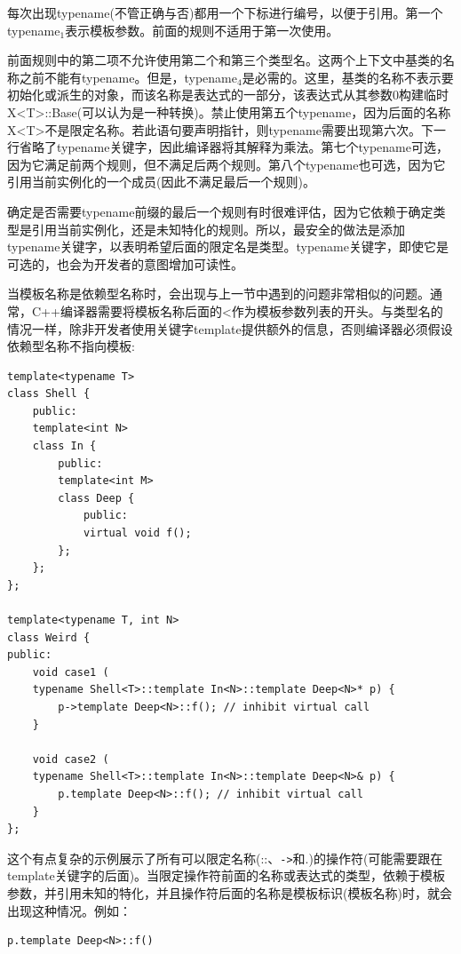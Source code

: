 每次出现typename(不管正确与否)都用一个下标进行编号，以便于引用。第一个typename$_1$表示模板参数。前面的规则不适用于第一次使用。

前面规则中的第二项不允许使用第二个和第三个类型名。这两个上下文中基类的名称之前不能有typename。但是，typename$_4$是必需的。这里，基类的名称不表示要初始化或派生的对象，而该名称是表达式的一部分，该表达式从其参数0构建临时X<T>::Base(可以认为是一种转换)。禁止使用第五个typename，因为后面的名称X<T>不是限定名称。若此语句要声明指针，则typename需要出现第六次。下一行省略了typename关键字，因此编译器将其解释为乘法。第七个typename可选，因为它满足前两个规则，但不满足后两个规则。第八个typename也可选，因为它引用当前实例化的一个成员(因此不满足最后一个规则)。

确定是否需要typename前缀的最后一个规则有时很难评估，因为它依赖于确定类型是引用当前实例化，还是未知特化的规则。所以，最安全的做法是添加typename关键字，以表明希望后面的限定名是类型。typename关键字，即使它是可选的，也会为开发者的意图增加可读性。


当模板名称是依赖型名称时，会出现与上一节中遇到的问题非常相似的问题。通常，C++编译器需要将模板名称后面的<作为模板参数列表的开头。与类型名的情况一样，除非开发者使用关键字template提供额外的信息，否则编译器必须假设依赖型名称不指向模板:

\begin{lstlisting}[style=styleCXX]
template<typename T>
class Shell {
	public:
	template<int N>
	class In {
		public:
		template<int M>
		class Deep {
			public:
			virtual void f();
		};
	};
};

template<typename T, int N>
class Weird {
public:
	void case1 (
	typename Shell<T>::template In<N>::template Deep<N>* p) {
		p->template Deep<N>::f(); // inhibit virtual call
	}

	void case2 (
	typename Shell<T>::template In<N>::template Deep<N>& p) {
		p.template Deep<N>::f(); // inhibit virtual call
	}
};
\end{lstlisting}

这个有点复杂的示例展示了所有可以限定名称(::、\texttt{->}和.)的操作符(可能需要跟在template关键字的后面)。当限定操作符前面的名称或表达式的类型，依赖于模板参数，并引用未知的特化，并且操作符后面的名称是模板标识(模板名称)时，就会出现这种情况。例如：

\begin{lstlisting}[style=styleCXX]
p.template Deep<N>::f()
\end{lstlisting}

